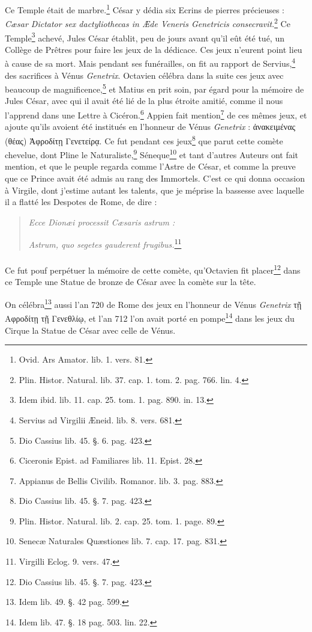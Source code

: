 \documentclass[a4paper, 11pt, oneside, polutonikogreek, french]{article}
\begin{document}
Ce Temple était de marbre.\footnote{Ovid. Ars Amator. lib. 1. vers. 81.} César y dédia six Ecrins de pierres précieuses : \emph{Cæsar Dictator sex dactyliothecas in Æde Veneris Genetricis consecravit}.\footnote{Plin. Histor. Natural. lib. 37. cap. 1. tom. 2. pag. 766. lin. 4.} Ce Temple\footnote{Idem ibid. lib. 11. cap. 25. tom. 1. pag. 890. in. 13.} achevé, Jules César établit, peu de jours avant qu'il eût été tué, un Collège de Prêtres pour faire les jeux de la dédicace. Ces jeux n'eurent point lieu à cause de sa mort. Mais pendant ses funérailles, on fit au rapport de Servius,\footnote{Servius ad Virgilii Æneid. lib. 8. vers. 681.} des sacrifices à Vénus \emph{Genetrix}. Octavien célébra dans la suite ces jeux avec beaucoup de magnificence,\footnote{Dio Cassius lib. 45. §. 6. pag. 423.} et Matius en prit soin, par égard pour la mémoire de Jules César, avec qui il avait été lié de la plus étroite amitié, comme il nous l'apprend dans une Lettre à Cicéron.\footnote{Ciceronis Epist. ad Familiares lib. 11. Epist. 28.} Appien fait mention\footnote{Appianus de Bellis Civilib. Romanor. lib. 3. pag. 883.} de ces mêmes jeux, et ajoute qu'ils avoient été institués en l'honneur de Vénus \emph{Genetrix} : ἀνακειμένας (θέας) Ἀφροδίτῃ Γενετείρᾳ. Ce fut pendant ces jeux\footnote{Dio Cassius lib. 45. §. 7. pag. 423.} que parut cette comète chevelue, dont Pline le Naturaliste,\footnote{Plin. Histor. Natural. lib. 2. cap. 25. tom. 1. page. 89.} Séneque\footnote{Senecæ Naturales Quæstiones lib. 7. cap. 17. pag. 831.} et tant d'autres Auteurs ont fait mention, et que le peuple regarda comme l'Astre de César, et comme la preuve que ce Prince avait été admis au rang des Immortels. C'est ce qui donna occasion à Virgile, dont j'estime autant les talents, que je méprise la bassesse avec laquelle il a flatté les Despotes de Rome, de dire :
\begin{quotation}
\emph{Ecce Dionæi processit Cæsaris astrum :}

\emph{Astrum, quo segetes gauderent frugibus.}\footnote{Virgilli Eclog. 9. vers. 47.}
\end{quotation}
\paragraph{}
Ce fut pouf perpétuer la mémoire de cette comète, qu'Octavien fit placer\footnote{Dio Cassius lib. 45. §. 7. pag. 423.} dans ce Temple une Statue de bronze de César avec la comète sur la tête.

On célébra\footnote{Idem lib. 49. §. 42 pag. 599.} aussi l'an 720 de Rome des jeux en l'honneur de Vénus \emph{Genetrix} τῇ Αφροδίτῃ τῇ Γενεθλίῳ, et l'an 712 l'on avait porté en pompe\footnote{Idem lib. 47. §. 18 pag. 503. lin. 22.} dans les jeux du Cirque la Statue de César avec celle de Vénus.
\end{document}
